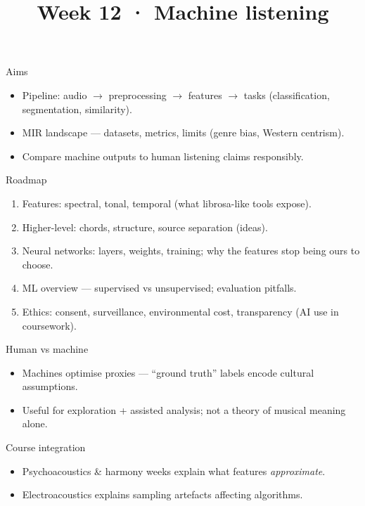 \documentclass[aspectratio=169]{beamer}
\title{Week 12 · Machine listening}
\subtitle{\coursename}
\institute{\instituteuo}
\date{}
\begin{document}
\begin{frame}
  \titlepage
\end{frame}

\begin{frame}{Aims}
  \begin{itemize}
    \item Pipeline: audio $\rightarrow$ preprocessing $\rightarrow$ features $\rightarrow$ tasks (classification, segmentation, similarity).
    \item MIR landscape — datasets, metrics, limits (genre bias, Western centrism).
    \item Compare machine outputs to human listening claims responsibly.
  \end{itemize}
\end{frame}

\begin{frame}{Roadmap}
  \begin{enumerate}
    \item Features: spectral, tonal, temporal (what librosa-like tools expose).
    \item Higher-level: chords, structure, source separation (ideas).
    \item Neural networks: layers, weights, training; why the features stop being ours to choose.
    \item ML overview — supervised vs unsupervised; evaluation pitfalls.
    \item Ethics: consent, surveillance, environmental cost, transparency (AI use in coursework).
  \end{enumerate}
\end{frame}

\begin{frame}{Human vs machine}
  \begin{itemize}
    \item Machines optimise proxies — ``ground truth'' labels encode cultural assumptions.
    \item Useful for exploration + assisted analysis; not a theory of musical meaning alone.
  \end{itemize}
\end{frame}

\begin{frame}{Course integration}
  \begin{itemize}
    \item Psychoacoustics \& harmony weeks explain what features \emph{approximate}.
    \item Electroacoustics explains sampling artefacts affecting algorithms.
  \end{itemize}
\end{frame}
\end{document}
